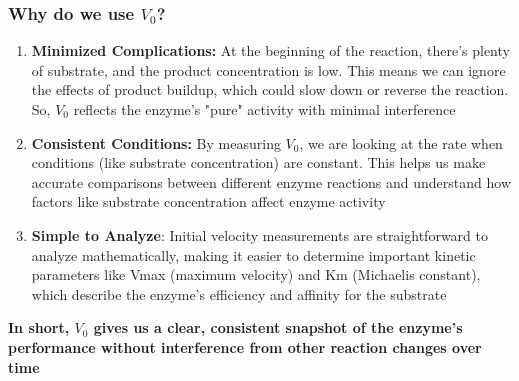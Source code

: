 \documentclass[10pt]{article}
\begin{document}
\subsubsection*{Why do we use $V_0$?}
\begin{enumerate}
    \item \textbf{Minimized Complications:} At the beginning of the reaction, there's plenty of substrate, and the product concentration is low.  This means we can ignore the effects of product buildup, which could slow down or reverse the reaction.  So, $V_0$ reflects the enzyme's "pure" activity with minimal interference
    \item \textbf{Consistent Conditions:} By measuring $V_0$, we are looking at the rate when conditions (like substrate concentration) are constant.  This helps us make accurate comparisons between different enzyme reactions and understand how factors like substrate concentration affect enzyme activity
    \item \textbf{Simple to Analyze}: Initial velocity measurements are straightforward to analyze mathematically, making it easier to determine important kinetic parameters like Vmax (maximum velocity) and Km (Michaelis constant), which describe the enzyme's efficiency and affinity for the substrate
\end{enumerate}
\textbf{In short, $V_0$ gives us a clear, consistent snapshot of the enzyme's performance without interference from other reaction changes over time}
\end{document}

